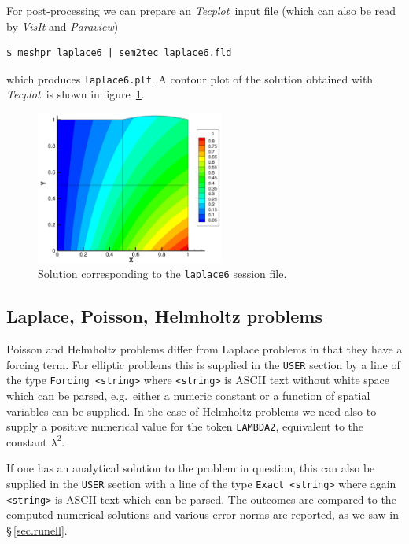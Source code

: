\documentclass[11pt]{report}
\newcommand{\Tecplot}{\emph{Tecplot}}
\newcommand{\eg}{e.g.\ } \newcommand{\CC}{\mathrm{c.c.}}
\begin{document}
For post-processing we can prepare an \Tecplot\ input file (which can
also be read by \emph{VisIt} and \emph{Paraview})
%
{\small
\begin{verbatim}
$ meshpr laplace6 | sem2tec laplace6.fld
\end{verbatim}
}
%
which produces \verb|laplace6.plt|.  A contour plot of the solution
obtained with \Tecplot\ is shown in figure~\ref{fig.lapcont}.

\begin{figure}
\begin{center}
\includegraphics[width=0.55\textwidth]{laplace6cont}
\end{center}
\caption{
  Solution corresponding to the \texttt{laplace6} session file.
}
\label{fig.lapcont}
\end{figure}

\subsection{Laplace, Poisson, Helmholtz problems}

Poisson and Helmholtz problems differ from Laplace problems in that
they have a forcing term.  For elliptic problems this is supplied in
the \verb|USER| section by a line of the type \verb|Forcing <string>|
where \verb|<string>| is ASCII text without white space which can be
parsed, \eg either a numeric constant or a function of spatial
variables can be supplied.  In the case of Helmholtz problems we need
also to supply a positive numerical value for the token
\verb|LAMBDA2|, equivalent to the constant $\lambda^2$.

If one has an analytical solution to the problem in question, this can
also be supplied in the \verb|USER| section with a line of the type
\verb|Exact <string>| where again \verb|<string>| is ASCII text which
can be parsed.  The outcomes are compared to the computed numerical
solutions and various error norms are reported, as we saw in
\S\,\ref{sec.runell}.
\end{document}
